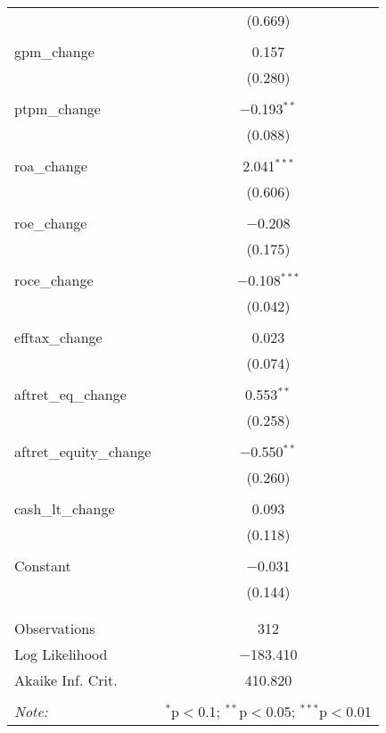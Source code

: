 \documentclass{article}
\begin{document}
\begin{table}[!htbp]
\begin{tabular}{@{\extracolsep{5pt}}lc}
  & (0.669) \\ 
  & \\ 
 gpm\_change & 0.157 \\ 
  & (0.280) \\ 
  & \\ 
 ptpm\_change & $-$0.193$^{**}$ \\ 
  & (0.088) \\ 
  & \\ 
 roa\_change & 2.041$^{***}$ \\ 
  & (0.606) \\ 
  & \\ 
 roe\_change & $-$0.208 \\ 
  & (0.175) \\ 
  & \\ 
 roce\_change & $-$0.108$^{***}$ \\ 
  & (0.042) \\ 
  & \\ 
 efftax\_change & 0.023 \\ 
  & (0.074) \\ 
  & \\ 
 aftret\_eq\_change & 0.553$^{**}$ \\ 
  & (0.258) \\ 
  & \\ 
 aftret\_equity\_change & $-$0.550$^{**}$ \\ 
  & (0.260) \\ 
  & \\ 
 cash\_lt\_change & 0.093 \\ 
  & (0.118) \\ 
  & \\ 
 Constant & $-$0.031 \\ 
  & (0.144) \\ 
  & \\ 
\hline \\[-1.8ex] 
Observations & 312 \\ 
Log Likelihood & $-$183.410 \\ 
Akaike Inf. Crit. & 410.820 \\ 
\hline 
\hline \\[-1.8ex] 
\textit{Note:}  & \multicolumn{1}{r}{$^{*}$p$<$0.1; $^{**}$p$<$0.05; $^{***}$p$<$0.01} \\ 
\end{tabular} 
\end{table} 
\end{document}

